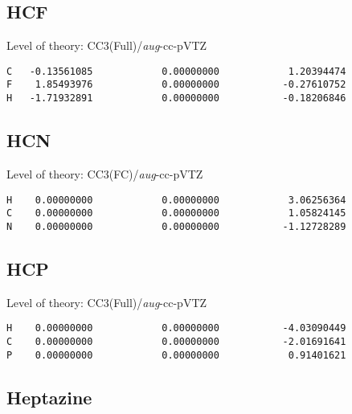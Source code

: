 \documentclass[journal=jctcce,manuscript=article,layout=traditional]{achemso}
\newcommand{\AVTZ}{\emph{aug}-cc-pVTZ}
\begin{document}
\subsection*{HCF}

\begin{singlespace}
Level of theory: CC3(Full)/{\AVTZ}
\begin{verbatim}
C   -0.13561085            0.00000000            1.20394474
F    1.85493976            0.00000000           -0.27610752
H   -1.71932891            0.00000000           -0.18206846
\end{verbatim}
\end{singlespace}

\subsection*{HCN}

\begin{singlespace}
Level of theory: CC3(FC)/{\AVTZ}
\begin{verbatim}
H    0.00000000            0.00000000            3.06256364
C    0.00000000            0.00000000            1.05824145
N    0.00000000            0.00000000           -1.12728289
\end{verbatim}
\end{singlespace}

\subsection*{HCP}

\begin{singlespace}
Level of theory: CC3(Full)/{\AVTZ}
\begin{verbatim}
H    0.00000000            0.00000000           -4.03090449
C    0.00000000            0.00000000           -2.01691641
P    0.00000000            0.00000000            0.91401621
\end{verbatim}
\end{singlespace}

\subsection*{Heptazine}
\end{document}
